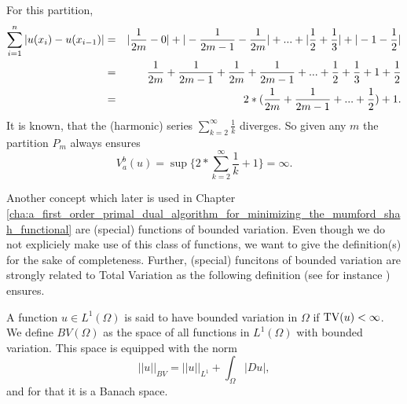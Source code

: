 \begin{example}
\begin{enumerate}
            For this partition,
                \begin{eqnarray}
                    \sum_{i = 1}^{n} |u(x_{i}) - u(x_{i-1})| &=& |\frac{1}{2m} - 0| + |-\frac{1}{2m-1} - \frac{1}{2m}| + ... + |\frac{1}{2} + \frac{1}{3}| + |-1 - \frac{1}{2}| \notag \\
                    &=& \frac{1}{2m} + \frac{1}{2m-1} + \frac{1}{2m} + \frac{1}{2m-1} + ... + \frac{1}{2} + \frac{1}{3} + 1 + \frac{1}{2} \notag \\
                    &=& 2*(\frac{1}{2m} + \frac{1}{2m-1} + ... + \frac{1}{2}) + 1. \notag
                \end{eqnarray}
            It is known, that the (harmonic) series $\sum_{k = 2}^{\infty} \frac{1}{k}$ diverges. So given any $m$ the partition $P_{m}$ always ensures
                $$
                    V^{b}_{a}(u) = \sup \{ 2 * \sum_{k = 2}^{\infty} \frac{1}{k} + 1 \} = \infty.
                $$
        \end{enumerate}

    \end{example}

    Another concept which later is used in Chapter \ref{cha:a_first_order_primal_dual_algorithm_for_minimizing_the_mumford_shah_functional}
    are (special) functions of bounded variation. Even though we do not expliciely make use of this class of functions, we want to give the definition(s) for the sake of completeness. Further, (special) funcitons of bounded variation are strongly related to Total Variation as the following definition (see for instance \cite{Giusti}) ensures.

    \begin{definition}
    \label{def:functions_of_bounded_variation}

        A function $u \in L^{1}(\Omega)$ is said to have bounded variation in $\Omega$ if $\textnormal{TV}(u) < \infty$. We define $BV(\Omega)$ as the space of all functions in $L^{1}(\Omega)$ with bounded variation. This space is equipped with the norm
            $$
                ||u||_{BV} = ||u||_{L^{1}} + \int_{\Omega} |Du|,
            $$
        and for that it is a Banach space.
    
    \end{definition}

